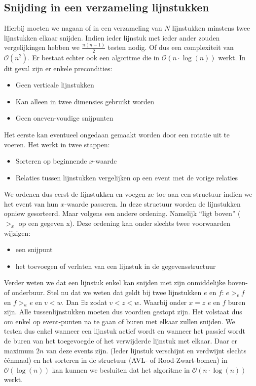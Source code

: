 \documentclass[a4paper,titlepage]{article}
\newcommand{\brak}[1]{\left(#1\right)}
\newcommand{\bigoh}[1]{\ensuremath{\mathcal{O}\left(#1\right)}}
\begin{document}
\subsection{Snijding in een verzameling lijnstukken}
Hierbij moeten we nagaan of in een verzameling van $N$ lijnstukken minstens twee lijnstukken elkaar snijden. Indien ieder lijnstuk met ieder ander zouden vergelijkingen hebben we $\frac{n\brak{n-1}}{2}$ testen nodig. Of dus een complexiteit van \bigoh{n^2}. Er bestaat echter ook een algoritme die in \bigoh{n\cdot\log\brak{n}} werkt. In dit geval zijn er enkele precondities:
\begin{itemize}
 \item Geen verticale lijnstukken
 \item Kan alleen in twee dimensies gebruikt worden
 \item Geen oneven-voudige snijpunten
\end{itemize}
Het eerste kan eventueel ongedaan gemaakt worden door een rotatie uit te voeren.
Het werkt in twee stappen:
\begin{itemize}
 \item Sorteren op beginnende $x$-waarde
 \item Relaties tussen lijnstukken vergelijken op een event met de vorige relaties
\end{itemize}
We ordenen dus eerst de lijnstukken en voegen ze toe aan een structuur indien we het event van hun $x$-waarde passeren. In deze structuur worden de lijnstukken opniew gesorteerd. Maar volgens een andere ordening. Namelijk ``ligt boven'' ($>_x$ op een gegeven x). Deze ordening kan onder slechts twee voorwaarden wijzigen:
\begin{itemize}
 \item een snijpunt
 \item het toevoegen of verlaten van een lijnstuk in de gegevensstructuur
\end{itemize}
Verder weten we dat een lijnstuk enkel kan snijden met zijn onmiddelijke boven- of onderbuur. Stel nu dat we weten dat geldt bij twee lijnstukken $e$ en $f$: $e>_vf$ en $f>_we$ en $v<w$. Dan $\exists z$ zodat $v<z<w$. Waarbij onder $x=z$ $e$ en $f$ buren zijn. Alle tussenlijnstukken moeten dus voordien gestopt zijn. Het volstaat dus om enkel op event-punten na te gaan of buren met elkaar zullen snijden. We testen dus enkel wanneer een lijnstuk actief wordt en wanneer het passief wordt de buren van het toegevoegde of het verwijderde lijnstuk met elkaar. Daar er maximum $2n$ van deze events zijn. (Ieder lijnstuk verschijnt en verdwijnt slechts \'e\'enmaal) en het sorteren in de structuur (AVL- of Rood-Zwart-bomen) in \bigoh{\log\brak{n}} kan kunnen we besluiten dat het algoritme in \bigoh{n\cdot\log\brak{n}} werkt.
\newpage
\end{document}

